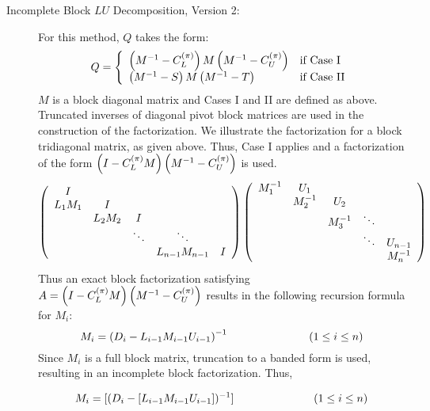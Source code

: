 \begin{description}
\item[Incomplete Block $LU$ Decomposition, Version 2:]
      For this method, $Q$ takes the form:
      \[
          Q = \left\{ \begin{array}{ll}
           \left( M^{-1}-C_L^{(\pi)} \right) M \left( M^{-1}-C_U^{(\pi)} \right)   & \mbox{if Case I} \\
           \left( M^{-1}-S   \right) M \left( M^{-1}-T   \right)   & \mbox{if Case II}
         \end{array} \right.
      \]
      $M$ is a block diagonal matrix and Cases I and II are defined
      as above.  Truncated inverses of diagonal pivot block matrices 
      are used in the construction of the factorization.  We illustrate 
      the factorization for a block tridiagonal matrix,
      as given above.   Thus, Case I applies and a factorization of
      the form $\left( I-C_L^{(\pi)} M \right)\left( M^{-1}-C_U^{(\pi)} \right)$ is used.
      \[ \left( \begin{array}{ccccc}
          I      &        &        &                & \\
          L_1M_1 & I      &        &                & \\
                 & L_2M_2 & I      &                & \\
                 &        & \ddots & \ddots         & \\   
                 &        &        & L_{n-1}M_{n-1} & I
          \end{array} \right) \left( \begin{array}{ccccc}
          M_1^{-1} & U_1      &          &        &         \\
                   & M_2^{-1} & U_2      &        &         \\
                   &          & M_3^{-1} & \ddots &         \\
                   &          &          & \ddots & U_{n-1} \\
                   &          &          &        & M_n^{-1} 
          \end{array} \right) \]
      Thus an exact block factorization satisfying $A=\left( I-C_L^{(\pi)} M \right)
      \left( M^{-1}-C_U^{(\pi)} \right)$ results in the following recursion formula for
      $M_i$: 
      \[ M_i = \left( D_i - L_{i-1} M_{i-1} U_{i-1} \right)^{-1}  
           \hspace*{1.0in} (1 \leq i \leq n) \]
      Since $M_i$ is a full block matrix, truncation to a
      banded form is used, resulting in an incomplete block 
      factorization.  Thus,
 
      \[ M_i = [(D_i - [ L_{i-1} M_{i-1} U_{i-1} ])^{-1} ]   
           \hspace*{1.0in} (1 \leq i \leq n) \]
 

\end{description}
